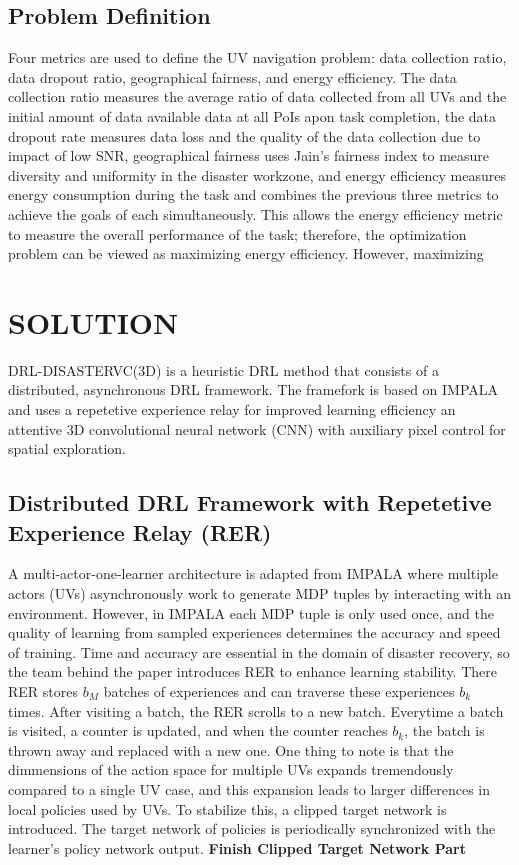 \documentclass[sigconf, natbib=false]{acmart}
\begin{document}
   \subsection{Problem Definition}
   Four metrics are used to define the UV navigation problem: data collection ratio, data dropout ratio, geographical fairness, and energy efficiency. The data collection ratio measures the average ratio of data collected from all UVs and the initial amount of data available data at all PoIs apon task completion, the data dropout rate measures data loss and the quality of the data collection due to impact of low SNR, geographical fairness uses Jain's fairness index to measure diversity and uniformity in the disaster workzone, and energy efficiency measures energy consumption during the task and combines the previous three metrics to achieve the goals of each simultaneously. This allows the energy efficiency metric to measure the overall performance of the task; therefore, the optimization problem can be viewed as maximizing energy efficiency. However, maximizing 

   \section{SOLUTION}
   DRL-DISASTERVC(3D) is a heuristic DRL method that consists of a distributed, asynchronous DRL framework. The framefork is based on IMPALA and uses a repetetive experience relay for improved learning efficiency an attentive 3D convolutional neural network (CNN) with auxiliary pixel control for spatial exploration.

   \subsection{Distributed DRL Framework with Repetetive Experience Relay (RER)}
   A multi-actor-one-learner architecture is adapted from IMPALA where multiple actors (UVs) asynchronously work to generate MDP tuples by interacting with an environment. However, in IMPALA each MDP tuple is only used once, and the quality of learning from sampled experiences determines the accuracy and speed of training. Time and accuracy are essential in the domain of disaster recovery, so the team behind the paper introduces RER to enhance learning stability. There RER stores $b_M$ batches of experiences and can traverse these experiences $b_k$ times. After visiting a batch, the RER scrolls to a new batch. Everytime a batch is visited, a counter is updated, and when the counter reaches $b_k$, the batch is thrown away and replaced with a new one. One thing to note is that the dimmensions of the action space for multiple UVs expands tremendously compared to a single UV case, and this expansion leads to larger differences in local policies used by UVs. To stabilize this, a clipped target network is introduced. The target network of policies is periodically synchronized with the learner's policy network output. \textbf{Finish Clipped Target Network Part}
   
\end{document}
